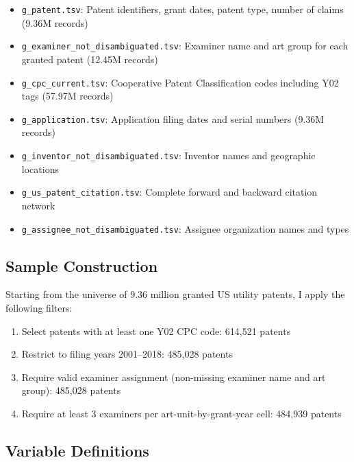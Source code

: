 \documentclass[12pt]{article}
\begin{document}
\begin{itemize}
\item \texttt{g\_patent.tsv}: Patent identifiers, grant dates, patent type, number of claims (9.36M records)
\item \texttt{g\_examiner\_not\_disambiguated.tsv}: Examiner name and art group for each granted patent (12.45M records)
\item \texttt{g\_cpc\_current.tsv}: Cooperative Patent Classification codes including Y02 tags (57.97M records)
\item \texttt{g\_application.tsv}: Application filing dates and serial numbers (9.36M records)
\item \texttt{g\_inventor\_not\_disambiguated.tsv}: Inventor names and geographic locations
\item \texttt{g\_us\_patent\_citation.tsv}: Complete forward and backward citation network
\item \texttt{g\_assignee\_not\_disambiguated.tsv}: Assignee organization names and types
\end{itemize}

\subsection{Sample Construction}

Starting from the universe of 9.36 million granted US utility patents, I apply the following filters:
\begin{enumerate}
\item Select patents with at least one Y02 CPC code: 614,521 patents
\item Restrict to filing years 2001--2018: 485,028 patents
\item Require valid examiner assignment (non-missing examiner name and art group): 485,028 patents
\item Require at least 3 examiners per art-unit-by-grant-year cell: 484,939 patents
\end{enumerate}

\subsection{Variable Definitions}
\end{document}
